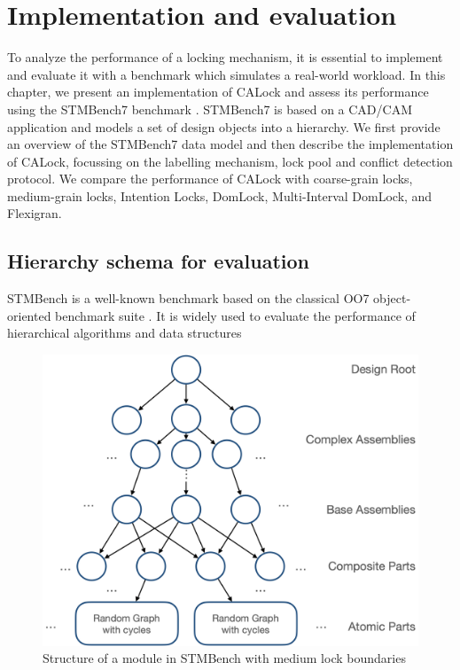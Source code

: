 \chapter{Implementation and evaluation}
\label{chap:implementation}

\minitoc

To analyze the performance of a locking mechanism, it is essential to implement and evaluate it with a benchmark which simulates a real-world workload. In this chapter, we present an implementation of CALock and assess its performance using the STMBench7 benchmark \cite{guerraoui2006stmbench7}. STMBench7 is based on a CAD/CAM application and models a set of design objects into a hierarchy. 
We first provide an overview of the STMBench7 data model and then describe the implementation of CALock, focussing on the labelling mechanism, lock pool and conflict detection protocol. We compare the performance of CALock with coarse-grain locks, medium-grain locks, Intention Locks, DomLock, Multi-Interval DomLock, and Flexigran.

\section{Hierarchy schema for evaluation}

STMBench is a well-known benchmark based on the classical OO7 object-oriented benchmark suite \cite{CareyDN93}. It is widely used to evaluate the performance of hierarchical algorithms and data structures \cite{prokopec_renaissance_2019,vale_pot_2016, felber_hardware_2016, carvalho_optimizing_2016, kim_scheduling_2015,filipe_nested_2015,rito_props_2014,kalikar2016domlock,anjuMID, FlexiGran2024, KalikarN18, GaneshKN18, liu_unleashing_2014} 

\begin{figure}[h]
    \centering
    \captionsetup{justification=centering}
    \includegraphics[width=.8\columnwidth]{figures/STMBenchModuleWithoutLocks.png}
    \caption{Structure of a module in STMBench with medium lock boundaries}
    \label{stmbenchModuleUnlocked}
\end{figure}

